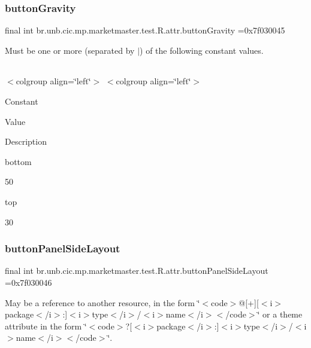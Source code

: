 \subsubsection{\texorpdfstring{button\+Gravity}{buttonGravity}}
{\footnotesize\ttfamily final int br.\+unb.\+cic.\+mp.\+marketmaster.\+test.\+R.\+attr.\+button\+Gravity =0x7f030045\hspace{0.3cm}{\ttfamily [static]}}

Must be one or more (separated by \textquotesingle{}$\vert$\textquotesingle{}) of the following constant values.

\tabulinesep=1mm
\begin{longtabu} spread 0pt [c]{*{0}{|X[-1]}|}
\hline
\end{longtabu}
$<$colgroup align=\char`\"{}left\char`\"{}$>$ $<$colgroup align=\char`\"{}left\char`\"{}$>$ 

Constant

Value

Description 

bottom

50

top

30\mbox{\label{classbr_1_1unb_1_1cic_1_1mp_1_1marketmaster_1_1test_1_1R_1_1attr_ae105af850ad4bbc21de661dd4fd14e8a}} 
\subsubsection{\texorpdfstring{button\+Panel\+Side\+Layout}{buttonPanelSideLayout}}
{\footnotesize\ttfamily final int br.\+unb.\+cic.\+mp.\+marketmaster.\+test.\+R.\+attr.\+button\+Panel\+Side\+Layout =0x7f030046\hspace{0.3cm}{\ttfamily [static]}}

May be a reference to another resource, in the form \char`\"{}$<$code$>$@\mbox{[}+\mbox{]}\mbox{[}$<$i$>$package$<$/i$>$\+:\mbox{]}$<$i$>$type$<$/i$>$/$<$i$>$name$<$/i$>$$<$/code$>$\char`\"{} or a theme attribute in the form \char`\"{}$<$code$>$?\mbox{[}$<$i$>$package$<$/i$>$\+:\mbox{]}$<$i$>$type$<$/i$>$/$<$i$>$name$<$/i$>$$<$/code$>$\char`\"{}. \mbox{\label{classbr_1_1unb_1_1cic_1_1mp_1_1marketmaster_1_1test_1_1R_1_1attr_aafdfb0fb0e035fb86f8936569ae82a95}} 
